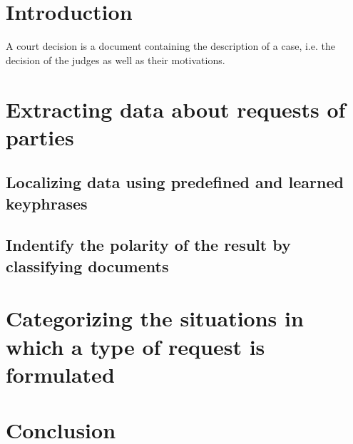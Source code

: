 \documentclass[runningheads,a4paper]{llncs}
\begin{document}
\begin{abstract}

\end{abstract}



\section{Introduction}

A court decision is a document containing the description of a case, i.e. the decision of the judges as well as their motivations. 



\section{Extracting data about requests of parties}

\subsection{Localizing data using predefined and learned keyphrases}

\subsection{Indentify the polarity of the result by classifying documents}




\section{Categorizing the situations in which a type of request is formulated}



\section{Conclusion}






\end{document}
